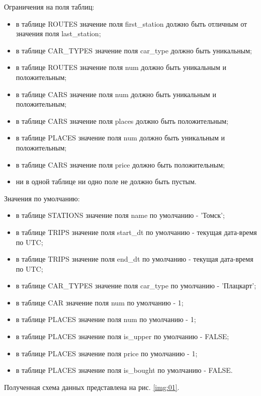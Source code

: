     Ограничения на поля таблиц:
    \begin{itemize}
        \item в таблице ROUTES значение поля first\_station должно быть отличным от значения поля last\_station;
        \item в таблице CAR\_TYPES значение поля car\_type должно быть уникальным;
        \item в таблице ROUTES значение поля num должно быть уникальным и положительным;
        \item в таблице CARS значение поля num должно быть уникальным и положительным;
        \item в таблице CARS значение поля places должно быть положительным;
        \item в таблице PLACES значение поля num должно быть уникальным и положительным;
        \item в таблице CARS значение поля price должно быть положительным;
        \item ни в одной таблице ни одно поле не должно быть пустым.
    \end{itemize}
    
    Значения по умолчанию:
    \begin{itemize}
        \item в таблице STATIONS значение поля name по умолчанию - 'Томск';
        \item в таблице TRIPS значение поля start\_dt по умолчанию - текущая дата-время по UTC;
        \item в таблице TRIPS значение поля end\_dt по умолчанию - текущая дата-время по UTC;
        \item в таблице CAR\_TYPES значение поля car\_type по умолчанию - 'Плацкарт';
        \item в таблице CAR значение поля num по умолчанию - 1;
        \item в таблице PLACES значение поля num по умолчанию - 1;
        \item в таблице PLACES значение поля is\_upper по умолчанию - FALSE;
        \item в таблице PLACES значение поля price по умолчанию - 1;
        \item в таблице PLACES значение поля is\_bought по умолчанию - FALSE.
    \end{itemize}
    
    Полученная схема данных представлена на рис. \ref{img:01}.\par
    
